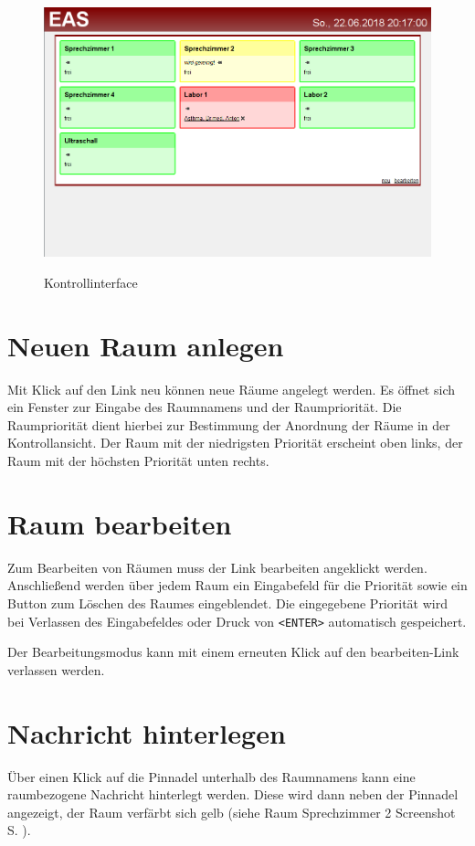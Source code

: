 \documentclass[a4paper,10pt]{scrreprt}
\begin{document}
\begin{figure}[h]
 \centering
 \includegraphics[width=\textwidth]{./Screenshot-Control.png}
 \label{controlinterface}
 \caption{Kontrollinterface}
\end{figure}

\section{Neuen Raum anlegen}
Mit Klick auf den Link \glqq{}neu\grqq{} können neue Räume angelegt werden. Es öffnet sich ein Fenster zur Eingabe des Raumnamens und der Raumpriorität. Die Raumpriorität dient hierbei zur Bestimmung der Anordnung der Räume in der Kontrollansicht.
Der Raum mit der niedrigsten Priorität erscheint oben links, der Raum mit der höchsten Priorität unten rechts.

\section{Raum bearbeiten}
Zum Bearbeiten von Räumen muss der Link \glqq{}bearbeiten\grqq{} angeklickt werden. Anschließend werden über jedem Raum ein Eingabefeld für die Priorität sowie ein Button zum Löschen des Raumes eingeblendet. Die eingegebene Priorität wird bei Verlassen des Eingabefeldes oder Druck von \texttt{<ENTER>}
automatisch gespeichert.

Der Bearbeitungsmodus kann mit einem erneuten Klick auf den \glqq{}bearbeiten\grqq{}-Link verlassen werden.

\section{Nachricht hinterlegen}
Über einen Klick auf die Pinnadel unterhalb des Raumnamens kann eine raumbezogene Nachricht hinterlegt werden. Diese wird dann neben der Pinnadel angezeigt, der Raum verfärbt sich gelb (siehe Raum \glqq{}Sprechzimmer 2\grqq{} Screenshot S. \pageref{controlinterface}).
\end{document}
